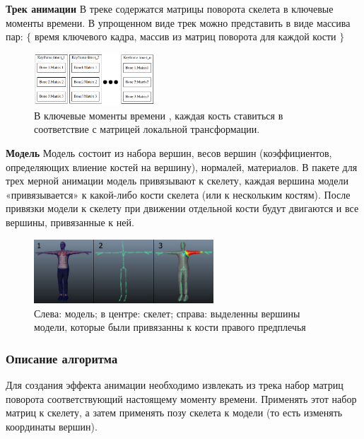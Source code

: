 \textbf{Трек анимации}
В треке содержатся матрицы поворота скелета в ключевые моменты времени.
В упрощенном виде трек можно представить в виде  массива пар: 
$\lbrace$ время ключевого кадра, массив из матриц поворота для каждой кости $\rbrace$

\begin{figure}[h!]
    \centering
    \includegraphics[width=0.4\textwidth]{anim_track.png}
    \caption{\small{В ключевые моменты времени , каждая кость ставиться в соответствие с матрицей локальной трансформации.}}
    
\end{figure}


\textbf{Модель}
Модель состоит из набора вершин, весов вершин (коэффициентов, определяющих влиение костей на вершину), нормалей, материалов. В пакете для трех мерной анимации модель привязывают к скелету, каждая вершина модели «привязывается» к какой-либо кости скелета (или к нескольким костям). После привязки модели к скелету при движении отдельной кости будут двигаются и все вершины, привязанные к ней.

\begin{figure}[h!]
    \centering
    \includegraphics[width=0.6\textwidth]{skinning.png}
    \caption{\small{Слева: модель; в центре: скелет; справа: выделенны вершины модели, которые были привязанны к кости правого предплечья}}
\end{figure}

\subsubsection{Описание алгоритма}




Для создания эффекта анимации необходимо извлекать из трека набор матриц поворота соответствующий настоящему моменту времени. Применять этот набор матриц к скелету, а затем применять позу скелета к модели (то есть изменять координаты вершин).

